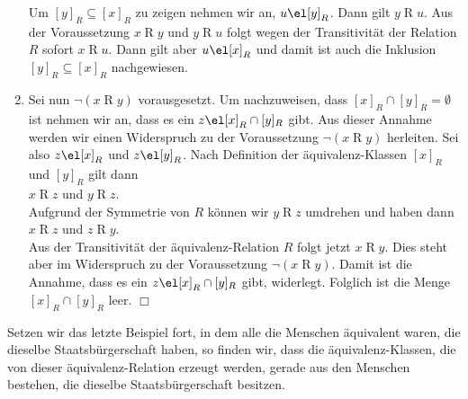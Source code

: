\begin{enumerate}
      Um $[y]_R \subseteq [x]_R$ zu zeigen nehmen wir an, $u \el [y]_R$.
      Dann gilt $y \mathop{R} u$.  Aus der Voraussetzung $x \mathop{R} y$ und
      $y \mathop{R} u$ folgt wegen der Transitivit\"{a}t der Relation $R$ sofort
      $x \mathop{R} u$.  Dann gilt aber $u \el [x]_R$ und damit ist auch die Inklusion
      $[y]_R \subseteq [x]_R$ nachgewiesen.
\item Sei nun $\neg (x \mathop{R} y)$ vorausgesetzt.  Um nachzuweisen,
      dass  $[x]_R \cap [y]_R = \emptyset$ ist nehmen wir an, dass
      es ein $z \el [x]_R \cap [y]_R$ gibt.  Aus dieser Annahme werden wir einen
      Widerspruch zu der Voraussetzung $\neg (x \mathop{R} y)$ 
        herleiten.  Sei also $z \el[x]_R$ und $z \el [y]_R$.  Nach Definition
        der \"{a}quivalenz-Klassen $[x]_R$ und $[y]_R$ gilt dann 
      \\[0.2cm]
      \hspace*{1.3cm}      
      $x \mathop{R} z$ \quad und \quad $y \mathop{R} z$.
      \\[0.2cm]
      Aufgrund der Symmetrie von $R$ k\"{o}nnen wir $y \mathop{R} z$ umdrehen und haben dann
      \\[0.2cm]
      \hspace*{1.3cm}      
      $x \mathop{R} z$ \quad und \quad $z \mathop{R} y$.
      \\[0.2cm]
      Aus der Transitivit\"{a}t der \"{a}quivalenz-Relation $R$ folgt jetzt
      $x \mathop{R} y$.
      Dies steht aber im Widerspruch zu der Voraussetzung $\neg (x \mathop{R} y)$.
      Damit ist die Annahme, dass es ein $z \el [x]_R \cap [y]_R$ gibt, widerlegt.
      Folglich ist die Menge $[x]_R \cap [y]_R$ leer.
      \hspace*{\fill} $\Box$
\end{enumerate}

\example
Setzen wir das letzte Beispiel fort, in dem alle die Menschen \"{a}quivalent waren, die dieselbe
Staatsb\"{u}rgerschaft haben, so finden wir, dass die \"{a}quivalenz-Klassen, die von dieser
\"{a}quivalenz-Relation erzeugt werden, gerade aus den Menschen bestehen, die dieselbe
Staatsb\"{u}rgerschaft besitzen.

